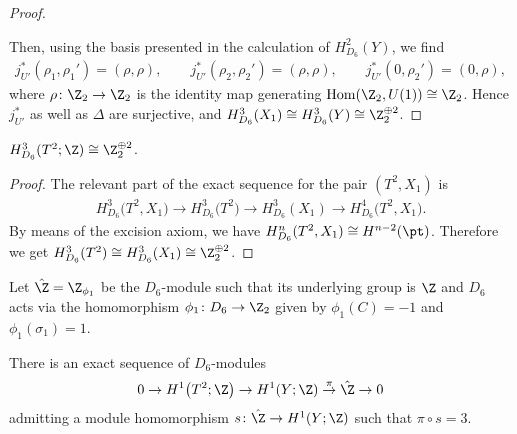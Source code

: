 \begin{proof}
\begin{itemize}
\end{itemize}
Then, using the basis presented in the calculation of $H^2_{D_6}(Y)$, we f\/ind
\begin{gather*}
j_{U'}^*(\rho_1, \rho_1') = (\rho, \rho), \qquad j_{U'}^*(\rho_2, \rho_2') = (\rho, \rho), \qquad
j_{U'}^*(0, \rho_2') = (0, \rho),
\end{gather*}
where $\rho\colon \Z_2 \to \Z_2$ is the identity map generating $\operatorname{Hom}(\Z_2, U(1)) \cong \Z_2$. Hence $j_{U'}^*$ as well as $\Delta$ are surjective, and $H^3_{D_6}(X_1) \cong H^3_{D_6}(Y) \cong \Z_2^{\oplus 2}$.
\end{proof}

\begin{thm}[\textsf{p6m}]
$H^3_{D_6}(T^2; \Z) \cong \Z_2^{\oplus 2}$.
\end{thm}

\begin{proof}
The relevant part of the exact sequence for the pair $(T^2, X_1)$ is
\begin{gather*}
H^3_{D_6}\big(T^2, X_1\big) \to H^3_{D_6}\big(T^2\big) \to H^3_{D_6}(X_1) \to H^4_{D_6}\big(T^2, X_1\big).
\end{gather*}
By means of the excision axiom, we have $H^n_{D_6}(T^2, X_1) \cong H^{n-2}(\pt)$. Therefore we get $H^3_{D_6}(T^2) \cong H^3_{D_6}(X_1) \cong \Z_2^{\oplus 2}$.
\end{proof}

Let $\hat{\Z} = \Z_{\phi_1}$ be the $D_6$-module such that its underlying group is $\Z$ and $D_6$ acts via the homomorphism $\phi_1\colon D_6 \to \Z_2$ given by $\phi_1(C) = -1$ and $\phi_1(\sigma_1) = 1$.

\begin{lem} \label{lem:p6m_short_exact_sequence_of_modules}
There is an exact sequence of $D_6$-modules
\begin{gather*}
0 \to H^1\big(T^2; \Z\big) \to H^1(Y; \Z) \overset{\pi}{\to} \hat{\Z} \to 0
\end{gather*}
admitting a module homomorphism $s\colon \hat{\Z} \to H^1(Y; \Z)$ such that $\pi \circ s = 3$.
\end{lem}

